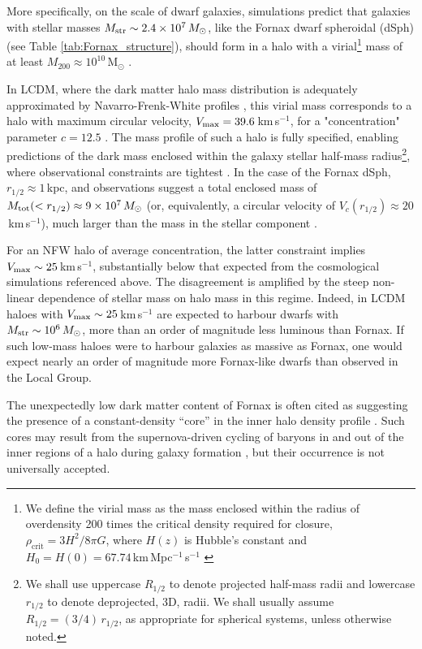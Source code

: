 \documentclass[fleqn,usenatbib]{mnras}
\begin{document}
More specifically, on the scale of dwarf galaxies, simulations predict that galaxies with stellar masses $M_{\rm str} \sim 2.4\times 10^7 \, M_\odot$, like the Fornax dwarf spheroidal (dSph) (see Table \ref{tab:Fornax_structure}), should form in a halo with a virial\footnote{We define the virial mass as the mass enclosed within the radius of overdensity 200 times the critical density required for closure, $\rho_\mathrm{crit}={3H^2/8\pi G}$, where $H(z)$ is Hubble's constant and $H_0 =H(0)= 67.74$\,km\,Mpc$^{-1}$\,s$^{-1}$ \citep{Planck2015}} mass of at least $M_{200}\approx 10^{10}$\,M$_\odot$ \citep{Wang2015,Fattahi2018,Garrison-Kimmel2019,Munshi2021}.

In LCDM, where the dark matter halo mass distribution is adequately approximated by Navarro-Frenk-White profiles \citep[hereafter NFW]{Navarro1996b,Navarro1997}, this virial mass corresponds to a halo with maximum circular velocity, $V_{\rm max}=39.6$\,km\,s$^{-1}$, for a "concentration" parameter $c=12.5$ \citep{Ludlow2016}. The mass profile of such a halo is fully specified, enabling predictions of the dark mass enclosed within the galaxy stellar half-mass radius\footnote{We shall use uppercase $R_{1/2}$ to denote projected half-mass radii and lowercase $r_{1/2}$ to denote deprojected, 3D, radii. We shall usually assume $R_{1/2}=(3/4)\, r_{1/2}$, as appropriate for spherical systems, unless otherwise noted.}, where observational constraints are tightest  \citep{Walker2009, Wolf2010}. In the case of the Fornax dSph, $r_{1/2}\approx 1$\,kpc, and observations suggest a total enclosed mass of $M_{\rm tot}(<r_{1/2}) \approx 9 \times 10^7\, M_\odot$ (or, equivalently, a circular velocity of $V_{c}(r_{1/2})\approx 20$\,km\,s$^{-1}$), much larger than the mass in the stellar component \citep{Fattahi2016b,Read2019}.

For an NFW halo of average concentration, the latter constraint implies $V_{\rm max} \sim 25$\,km\,s$^{-1}$, substantially below that expected from the cosmological simulations referenced above. The disagreement is amplified by the steep non-linear dependence of stellar mass on halo mass in this regime. Indeed, in LCDM haloes with $V_{\rm max}\sim 25$\,km\,s$^{-1}$ are expected to harbour dwarfs with $M_{\rm str}\sim 10^6\, M_\odot$, more than an order of magnitude less luminous than Fornax. If such low-mass haloes were to harbour galaxies as massive as Fornax, one would expect nearly an order of magnitude more Fornax-like dwarfs than observed in the Local Group.

The unexpectedly low dark matter content of Fornax is often cited as suggesting the presence of a constant-density ``core'' in the inner halo density profile \citep[see, e.g.,][]{Walker2011,Amorisco2013}. Such cores may result from the supernova-driven cycling of baryons in and out of the inner regions of a halo during galaxy formation  \citep[see; e.g.,][]{Navarro1996b, ReadGilmore2005, PontzenGovernato2012, DiCintio2014}, but their occurrence is not universally accepted. %
\end{document}
